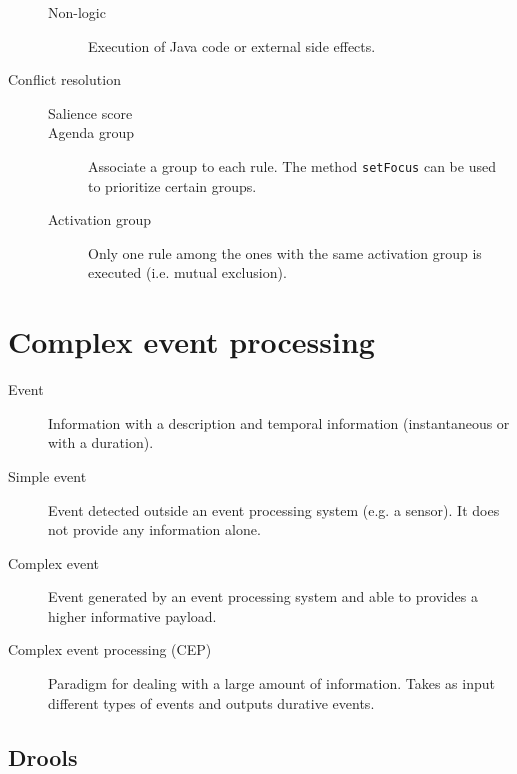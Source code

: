 \begin{description}
\begin{description}
            \item[Non-logic]
                Execution of Java code or external side effects.
        \end{description}

    \item[Conflict resolution] \phantom{}
        \begin{description}
            \item[Salience score]
            \item[Agenda group]
                Associate a group to each rule. The method \texttt{setFocus} can be used to prioritize certain groups.
            \item[Activation group]
                Only one rule among the ones with the same activation group is executed (i.e. mutual exclusion).
        \end{description}
\end{description}



\section{Complex event processing}

\begin{description}
    \item[Event] 
        Information with a description and temporal information (instantaneous or with a duration).

    \item[Simple event] 
        Event detected outside an event processing system (e.g. a sensor). It does not provide any information alone.

    \item[Complex event] 
        Event generated by an event processing system and able to provides a higher informative payload.

    \item[Complex event processing (CEP)] 
        Paradigm for dealing with a large amount of information.
        Takes as input different types of events and outputs durative events.
\end{description}


\subsection{Drools}

